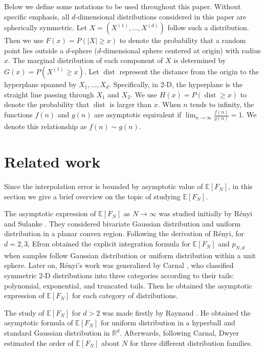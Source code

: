 \documentclass[conference,a4paper]{IEEEtran}
\DeclareMathOperator{\dist}{dist}
\def\E{\mathbb{E}}
\begin{document}
Below we define some notations to be used throughout this paper.
Without specific emphasis, all $d$-dimensional distributions considered in this paper are spherically symmetric.
Let $X=(X^{(1)},\dots, X^{(d)})$ follow such a distribution.
Then we use $F(x)=P(|X|\geq x)$ to denote the probability that a random point lies outside
a $d$-sphere ($d$-dimensional sphere centered at origin) with radius $x$.
The marginal distribution of each component of $X$ is determined by $G(x)=P(X^{(1)}\geq x)$.
Let $\dist$ represent the distance from the origin to the hyperplane spanned by $X_1, \dots, X_d$.
Specifically, in 2-D, the hyperplane is the straight line passing through $X_1$ and $X_2$.
We use $H(x)=P(\dist\geq x)$ to denote the probability that $\dist$ is larger than $x$.
When $n$ tends to infinity, the functions $f(n)$ and $g(n)$ are asymptotic equivalent if $\lim_{n\to \infty} \frac{f(n)}{g(n)}=1$.
We denote this relationship as $f(n) \sim g(n)$.

\section{Related work}
Since the interpolation error is bounded by
asymptotic value of $\E[F_N]$,
in this section we give a brief overview on the topic of studying $\E[F_N]$.

The asymptotic expression of $\E[F_N]$ as $N\to \infty$
was studied initially by R{\'e}nyi and Sulanke \cite{renyi1963konvexe}.
They considered
bivariate Gaussian distribution and uniform distribution
in a planar convex region.
Following the derivation of R{\'e}nyi, for $d=2,3$, Efron \cite{efron1965convex} obtained the explicit integration formula for $\E[F_N]$ and $p_{N,d}$ 
when samples follow Gaussian distribution or uniform distribution within a unit sphere.
Later on,  R{\'e}nyi's work was generalized by
Carnal \cite{carnal1970konvexe}, who
classified symmetric 2-D distributions
into three categories according to their tails:
polynomial, exponential, and truncated tails.
Then he obtained the asymptotic expression of $\E[F_N]$
for each category of distributions.




The study of $\E[F_N]$ for $d>2$ was made firstly by
Raynaud
\cite{raynaud1970enveloppe}.
He obtained the asymptotic formula of $\E[F_N]$
for uniform distribution in a hyperball
and standard Gaussian distribution in $\mathbb{R}^d$.
Afterwards, following Carnal, Dwyer \cite{dwyer1991convex}
estimated the order of $\E[F_N]$ about $N$
for three different distribution families.
\end{document}
